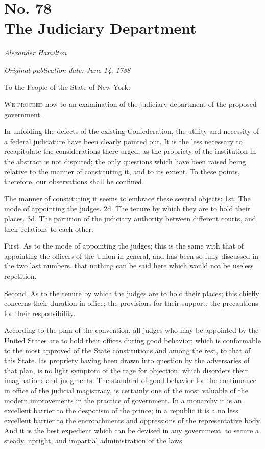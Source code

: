 \chapter[No. 78: The Judiciary Department]{No. 78\\ {\small The Judiciary Department}}

\textit{Alexander Hamilton}

\textit{Original publication date: June 14, 1788}
\vspace{1cm}

To the People of the State of New York:
\vspace{.4cm}

\textsc{We proceed} now to an examination of the judiciary department of the proposed government.

In unfolding the defects of the existing Confederation, the utility and necessity of a federal judicature have been clearly pointed out. 
It is the less necessary to recapitulate the considerations there urged, as the propriety of the institution in the abstract is not disputed; the only questions which have been raised being relative to the manner of constituting it, and to its extent. 
To these points, therefore, our observations shall be confined.

The manner of constituting it seems to embrace these several objects: 1st. 
The mode of appointing the judges. 
2d. 
The tenure by which they are to hold their places. 
3d. 
The partition of the judiciary authority between different courts, and their relations to each other.

First. 
As to the mode of appointing the judges; this is the same with that of appointing the officers of the Union in general, and has been so fully discussed in the two last numbers, that nothing can be said here which would not be useless repetition.

Second. 
As to the tenure by which the judges are to hold their places; this chiefly concerns their duration in office; the provisions for their support; the precautions for their responsibility.

According to the plan of the convention, all judges who may be appointed by the United States are to hold their offices during good behavior; which is conformable to the most approved of the State constitutions and among the rest, to that of this State. 
Its propriety having been drawn into question by the adversaries of that plan, is no light symptom of the rage for objection, which disorders their imaginations and judgments. 
The standard of good behavior for the continuance in office of the judicial magistracy, is certainly one of the most valuable of the modern improvements in the practice of government. 
In a monarchy it is an excellent barrier to the despotism of the prince; in a republic it is a no less excellent barrier to the encroachments and oppressions of the representative body. 
And it is the best expedient which can be devised in any government, to secure a steady, upright, and impartial administration of the laws.


